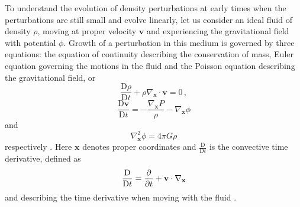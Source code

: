 \documentclass[english, oneside]{HYgradu}
\begin{document}
To understand the evolution of density perturbations at early times when the perturbations are still small and evolve linearly, let us consider an ideal fluid of density $\rho$, moving at proper velocity $\mathbf{v}$ and experiencing the gravitational field with potential $\phi$. Growth of a perturbation in this medium is governed by three equations: the equation of continuity describing the conservation of mass, Euler equation governing the motions in the fluid and the Poisson equation describing the gravitational field, or
\begin{equation}\label{continuity}
\frac{\textrm{D}\rho}{\textrm{D}t} + \rho \nabla_\mathbf{x}\cdot{\mathbf{v}} = 0 \,,
\end{equation}
\begin{equation}\label{euler}
\frac{\textrm{D}\mathbf{v}}{\textrm{D}t} = - \frac{\nabla_\mathbf{x} P}{\rho} - \nabla_\mathbf{x}\phi
\end{equation}
and
\begin{equation}\label{poisson}
\nabla_\mathbf{x}^2\phi = 4\pi G\rho
\end{equation}
respectively \citep{mo2010galaxy}. Here $\mathbf{x}$ denotes proper coordinates and $\frac{\textrm{D}}{\textrm{D}t}$ is the convective time derivative, defined as
\begin{equation}
\frac{\textrm{D}}{\textrm{D}t} = \pdv{}{t} + \mathbf{v}\cdot\nabla_\mathbf{x}
\end{equation}
and describing the time derivative when moving with the fluid \citep{mo2010galaxy}.
\end{document}
